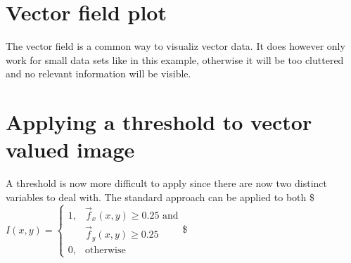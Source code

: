 \documentclass[letterpaper,10pt,english]{sphinxmanual}
\begin{document}
\begin{sphinxVerbatim}[commandchars=\\\{\}]
   
\end{sphinxVerbatim}

\noindent{}


\section{Vector field plot}
\label{\detokenize{04-BasicSegmentation:vector-field-plot}}
\sphinxAtStartPar
The vector field is a common way to visualiz vector data. It does however only work for small data sets like in this example, otherwise it will be too cluttered and no relevant information will be visible.

\begin{sphinxVerbatim}[commandchars=\\\{\}]
       
\PYG{p}{[}\PYG{p}{]} \PYG{p}{[}\PYG{p}{]} \PYG{p}{[}\PYG{p}{]} \PYG{p}{[}\PYG{p}{]} \PYG{p}{[}\PYG{p}{]}   
\end{sphinxVerbatim}

\noindent{}


\section{Applying a threshold to vector valued image}
\label{\detokenize{04-BasicSegmentation:applying-a-threshold-to-vector-valued-image}}
\sphinxAtStartPar
A threshold is now more difficult to apply since there are now two distinct variables to deal with. The standard approach can be applied to both
\$\( I(x,y) = 
\begin{cases}
1, & \vec{f}_x(x,y) \geq0.25 \text{ and}\\
& \vec{f}_y(x,y) \geq0.25 \\
0, & \text{otherwise}
\end{cases}\)\$
\end{document}
